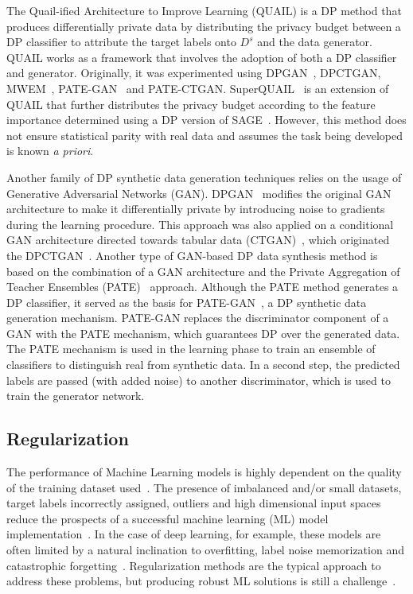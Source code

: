 \documentclass[parskip=full]{scrartcl}
\begin{document}
The Quail-ified Architecture to Improve Learning (QUAIL) is a DP method that
produces differentially private data by distributing the privacy budget
between a DP classifier to attribute the target labels onto $D^s$ and the data
generator. QUAIL works as a framework that involves the adoption of both a DP
classifier and generator. Originally, it was experimented using
DPGAN~\cite{xie2018differentially}, DPCTGAN, MWEM~\cite{hardt2012simple},
PATE-GAN~\cite{jordon2018pate} and PATE-CTGAN\@.
SuperQUAIL~\cite{rosenblatt2022spending} is an extension of QUAIL that further
distributes the privacy budget according to the feature importance determined
using a DP version of SAGE~\cite{covert2020understanding}. However, this
method does not ensure statistical parity with real data and assumes the task
being developed is known \textit{a priori}.

Another family of DP synthetic data generation techniques relies on the usage
of Generative Adversarial Networks (GAN). DPGAN~\cite{xie2018differentially}
modifies the original GAN architecture to make it differentially private by
introducing noise to gradients during the learning procedure. This approach
was also applied on a conditional GAN architecture directed towards tabular
data (CTGAN)~\cite{xu2019modeling}, which originated the
DPCTGAN~\cite{rosenblatt2020differentially}. Another type of GAN-based DP data
synthesis method is based on the combination of a GAN architecture and the
Private Aggregation of Teacher Ensembles (PATE)~\cite{papernot2017semi}
approach. Although the PATE method generates a DP classifier, it served as the
basis for PATE-GAN~\cite{jordon2018pate}, a DP synthetic data generation
mechanism. PATE-GAN replaces the discriminator component of a GAN with the
PATE mechanism, which guarantees DP over the generated data. The PATE
mechanism is used in the learning phase to train an ensemble of classifiers to
distinguish real from synthetic data. In a second step, the predicted labels
are passed (with added noise) to another discriminator, which is used to train
the generator network.

\subsection{Regularization}\label{sec:regularization}

The performance of Machine Learning models is highly dependent on the quality
of the training dataset used~\cite{Fenza2021, Halevy2009}. The presence of
imbalanced and/or small datasets, target labels incorrectly assigned, outliers
and high dimensional input spaces reduce the prospects of a successful machine
learning (ML) model implementation~\cite{Halevy2009, Domingos2012,
Salman2019}. In the case of deep learning, for example, these
models are often limited by a natural inclination to overfitting, label noise
memorization and catastrophic forgetting~\cite{Xie2021}. Regularization
methods are the typical approach to address these problems, but producing
robust ML solutions is still a challenge~\cite{Zhang2021}.
\end{document}
